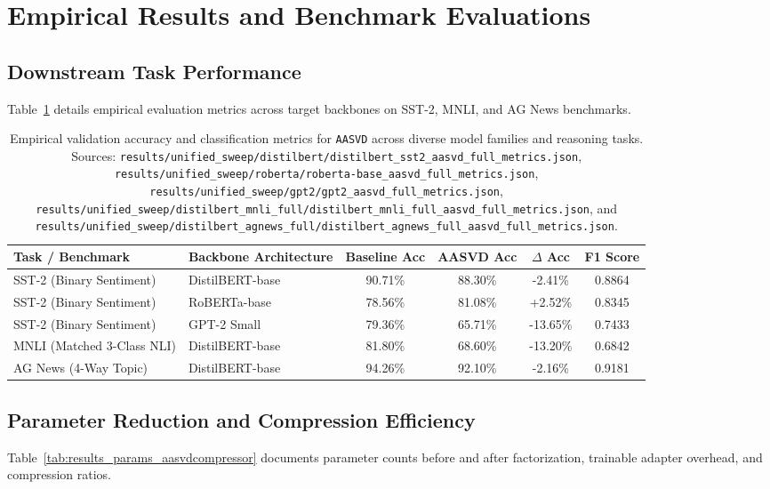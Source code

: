 \section{Empirical Results and Benchmark Evaluations}

\subsection{Downstream Task Performance}
Table~\ref{tab:results_acc_aasvdcompressor} details empirical evaluation metrics across target backbones on SST-2, MNLI, and AG News benchmarks.

\begin{table}[t]
\centering
\small
\begin{tabular}{llcccc}
\toprule
\textbf{Task / Benchmark} & \textbf{Backbone Architecture} & \textbf{Baseline Acc} & \textbf{AASVD Acc} & \textbf{$\Delta$ Acc} & \textbf{F1 Score} \\
\midrule
SST-2 (Binary Sentiment) & DistilBERT-base & 90.71\% & 88.30\% & -2.41\% & 0.8864 \\
SST-2 (Binary Sentiment) & RoBERTa-base & 78.56\% & 81.08\% & +2.52\% & 0.8345 \\
SST-2 (Binary Sentiment) & GPT-2 Small & 79.36\% & 65.71\% & -13.65\% & 0.7433 \\
MNLI (Matched 3-Class NLI) & DistilBERT-base & 81.80\% & 68.60\% & -13.20\% & 0.6842 \\
AG News (4-Way Topic) & DistilBERT-base & 94.26\% & 92.10\% & -2.16\% & 0.9181 \\
\bottomrule
\end{tabular}
\caption{Empirical validation accuracy and classification metrics for \texttt{AASVD} across diverse model families and reasoning tasks. Sources: \texttt{results/unified\_sweep/distilbert/distilbert\_sst2\_aasvd\_full\_metrics.json}, \texttt{results/unified\_sweep/roberta/roberta-base\_aasvd\_full\_metrics.json}, \texttt{results/unified\_sweep/gpt2/gpt2\_aasvd\_full\_metrics.json}, \texttt{results/unified\_sweep/distilbert\_mnli\_full/distilbert\_mnli\_full\_aasvd\_full\_metrics.json}, and \texttt{results/unified\_sweep/distilbert\_agnews\_full/distilbert\_agnews\_full\_aasvd\_full\_metrics.json}.}
\label{tab:results_acc_aasvdcompressor}
\end{table}

\subsection{Parameter Reduction and Compression Efficiency}
Table~\ref{tab:results_params_aasvdcompressor} documents parameter counts before and after factorization, trainable adapter overhead, and compression ratios.

